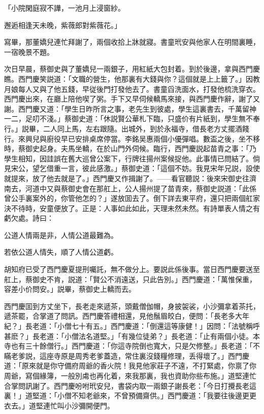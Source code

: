 \begin{myquote}
「小院閑庭寂不譁，一池月上浸窗紗。

邂逅相逢天未晚，紫薇郎對紫薇花。」
\end{myquote}

寫畢，那董嬌兒連忙拜謝了，兩個收拾上牀就寢。書童玳安與他家人在明間裏睡，一宿晚景不題。

次日早晨，蔡御史與了董嬌兒一兩銀子，用紅紙大包封着。到於後邊，拿與西門慶瞧。西門慶笑説道：「文職的營生，他那裏有大錢與你？這個就是上上籤了。」因教月娘每人又與了他五錢，早従後門打發他去了。書童舀洗面水，打發他梳洗穿衣。西門慶出來，在廳上陪他喫了粥。手下又早伺候轎馬來接，與西門慶作辭，謝了又謝。西門慶又道：「學生日昨所言之事，老先生到彼處，學生這裏書去，千萬留神一二，足叨不淺。」蔡御史道：「休説賢公華札下臨，只盛价有片紙到，學生無不奉行。」説畢，二人同上馬，左右跟隨。出城外，到於永福寺，借長老方丈擺酒餞行。來興兒與廚役早已安排桌席停當。李銘吴惠兩個小優彈唱。數盃之後，坐不移時，蔡御史起身。夫馬坐轎，在於山門外伺候。臨行，西門慶説起苗青之事：「乃學生相知，因詿誤在舊大巡曾公案下，行牌往揚州案候捉他。此事情已問結了。倘見宋公，望乞借重一言，彼此感激。」蔡御史道：「這個不妨。我見宋年兄説，設使就提來，放了他去就是了。」西門慶又作揖謝了。——看官聽説：後來宋御史往濟南去，河道中又與蔡御史會在那舡上，公人揚州提了苗青來，蔡御史説道：「此係曾公手裏案外的，你管他怎的？」遂放囬去了。倒下詳去東平府，還只把兩個舡家決不待時，安童便放了。正是：人事如此如此，天理未然未然。有詩單表人情之有虧欠處。詩曰：

\begin{myquote}
公道人情兩是非，人情公道最難為。

若依公道人情失，順了人情公道虧。
\end{myquote}

胡知府已受了西門慶夏提刑囑託，無不做分上。要説此係後事。當日西門慶要送至舡上，蔡御史不肯，説道：「賢公不消遠送，只此告別。」西門慶道：「萬惟保重，容差小价問安。」説畢，蔡御史上轎而去。

西門慶囬到方丈坐下，長老走來遞茶，頭戴僧伽帽，身披袈裟，小沙彌拿着茶托，遞茶罷，合掌道了問訊。西門慶答禮相還，見他鬚眉皎白，便問：「長老多大年紀？」長老道：「小僧七十有五。」西門慶道：「倒還這等康健！」因問：「法號稱呼甚麽？」長老道：「小僧法名道堅。」「有幾位徒弟？」長老道：「止有兩個小徒。本寺也有三十餘僧行。」西門慶道：「你這寺院倒也寬大，只是欠修整。」長老道：「不瞞老爹説，這座寺原是周秀老爹蓋造，常住裏沒錢糧修理，丢得壞了。」西門慶道：「原來就是你守備府周爺的香火院！我見他家莊子不遠，不打緊處，你禀了你周爺，寫個緣簿，一般別䖏也再化着，來我那裏，我也資助你些布施。」道堅連忙合掌問訊謝了。西門慶吩咐玳安兒，書袋内取一兩銀子謝長老：「今日打攪長老這裏！」道堅道：「小僧不知老爺來，不曾預備齋供。」西門慶道：「我要往後邊更更衣去。」道堅連忙叫小沙彌開便門。

